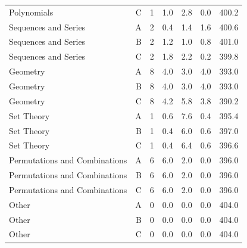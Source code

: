 \begin{longtable}{@{}lrrrrrr@{}}
Polynomials & C & 1 & 1.0 & 2.8 & 0.0 & 400.2\\
Sequences and Series & A & 2 & 0.4 & 1.4 & 1.6 & 400.6\\
Sequences and Series & B & 2 & 1.2 & 1.0 & 0.8 & 401.0\\
Sequences and Series & C & 2 & 1.8 & 2.2 & 0.2 & 399.8\\
Geometry & A & 8 & 4.0 & 3.0 & 4.0 & 393.0\\
Geometry & B & 8 & 4.0 & 3.0 & 4.0 & 393.0\\
Geometry & C & 8 & 4.2 & 5.8 & 3.8 & 390.2\\
Set Theory & A & 1 & 0.6 & 7.6 & 0.4 & 395.4\\
Set Theory & B & 1 & 0.4 & 6.0 & 0.6 & 397.0\\
Set Theory & C & 1 & 0.4 & 6.4 & 0.6 & 396.6\\
Permutations and Combinations & A & 6 & 6.0 & 2.0 & 0.0 & 396.0\\
Permutations and Combinations & B & 6 & 6.0 & 2.0 & 0.0 & 396.0\\
Permutations and Combinations & C & 6 & 6.0 & 2.0 & 0.0 & 396.0\\
Other & A & 0 & 0.0 & 0.0 & 0.0 & 404.0\\
Other & B & 0 & 0.0 & 0.0 & 0.0 & 404.0\\
Other & C & 0 & 0.0 & 0.0 & 0.0 & 404.0\\
\bottomrule\end{longtable}\normalsize
